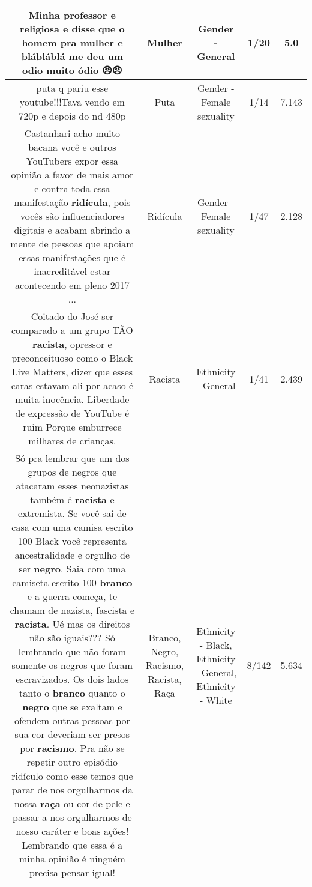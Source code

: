 \documentclass[11pt]{article}
\newlength\mylength
\begin{document}
\begin{center}
\begin{longtable}{|C{.65\mylength}|C{.30\mylength}|C{.12\mylength}|C{.12\mylength}|C{.12\mylength}|}
  \small Minha professor e religiosa e disse que o homem pra \textbf{mulher} e blábláblá me deu um odio muito ódio 😠😠\normalsize   & Mulher & Gender - General & 1/20 & 5.0 \\  \hline
  \small puta q pariu esse youtube!!!Tava vendo em 720p e depois do nd 480p\normalsize   & Puta & Gender - Female sexuality & 1/14 & 7.143 \\  \hline
  \small Castanhari acho muito bacana você e outros YouTubers expor essa opinião a favor de mais amor e contra toda essa manifestação \textbf{ridícula}, pois vocês são influenciadores digitais e acabam abrindo a mente de pessoas que apoiam essas manifestações que é inacreditável estar acontecendo em pleno 2017 ...\normalsize   & Ridícula & Gender - Female sexuality & 1/47 & 2.128 \\  \hline
  \small Coitado do José ser comparado a um grupo TÃO \textbf{racista}, opressor e preconceituoso como o Black Live Matters, dizer que esses caras estavam ali por acaso é muita inocência. Liberdade de expressão de YouTube é ruim Porque emburrece milhares de crianças.\normalsize   & Racista & Ethnicity - General & 1/41 & 2.439 \\  \hline
  \small Só pra lembrar que um dos grupos de negros que atacaram esses neonazistas também é \textbf{racista} e extremista. Se você sai de casa com uma camisa escrito 100 Black você representa ancestralidade e orgulho de ser \textbf{negro}. Saia com uma camiseta escrito 100 \textbf{branco} e a guerra começa, te chamam de nazista, fascista e \textbf{racista}. Ué mas os direitos não são iguais??? Só lembrando que não foram somente os negros que foram escravizados. Os dois lados tanto o \textbf{branco} quanto o \textbf{negro} que  se exaltam e ofendem outras pessoas por sua cor deveriam ser presos por \textbf{racismo}. Pra não se repetir outro episódio ridículo como esse temos que parar de nos orgulharmos da nossa \textbf{raça} ou cor de pele e passar a nos orgulharmos de nosso caráter e boas ações! Lembrando que essa é a minha opinião é ninguém precisa pensar igual!\normalsize   & Branco, Negro, Racismo, Racista, Raça & Ethnicity - Black, Ethnicity - General, Ethnicity - White & 8/142 & 5.634 \\  \hline

\end{longtable}
\end{center}
\end{document}
